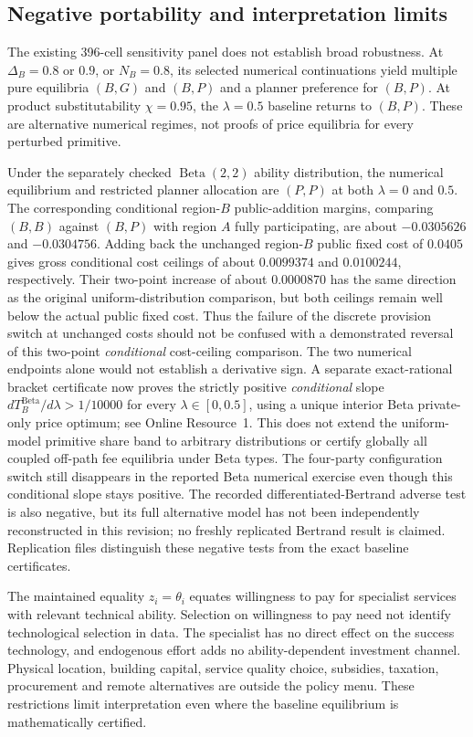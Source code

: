 \subsection{Negative portability and interpretation limits}\label{sec:robustness}
The existing 396-cell sensitivity panel does not establish broad robustness.
At $\Delta_B=0.8$ or $0.9$, or $N_B=0.8$, its selected numerical continuations yield multiple pure equilibria $(B,G)$ and $(B,P)$ and a planner preference for $(B,P)$.
At product substitutability $\chi=0.95$, the $\lambda=0.5$ baseline returns to $(B,P)$.
These are alternative numerical regimes, not proofs of price equilibria for every perturbed primitive.

Under the separately checked $\operatorname{Beta}(2,2)$ ability distribution, the numerical equilibrium and restricted planner allocation are $(P,P)$ at both $\lambda=0$ and $0.5$.
The corresponding conditional region-$B$ public-addition margins, comparing $(B,B)$ against $(B,P)$ with region $A$ fully participating, are about $-0.0305626$ and $-0.0304756$.
Adding back the unchanged region-$B$ public fixed cost of $0.0405$ gives gross conditional cost ceilings of about $0.0099374$ and $0.0100244$, respectively. Their two-point increase of about $0.0000870$ has the same direction as the original uniform-distribution comparison, but both ceilings remain well below the actual public fixed cost. Thus the failure of the discrete provision switch at unchanged costs should not be confused with a demonstrated reversal of this two-point \emph{conditional} cost-ceiling comparison.
The two numerical endpoints alone would not establish a derivative sign. A separate exact-rational bracket certificate now proves the strictly positive \emph{conditional} slope $dT_B^{\mathrm{Beta}}/d\lambda>1/10000$ for every $\lambda\in[0,0.5]$, using a unique interior Beta private-only price optimum; see Online Resource~1. This does not extend the uniform-model primitive share band to arbitrary distributions or certify globally all coupled off-path fee equilibria under Beta types. The four-party configuration switch still disappears in the reported Beta numerical exercise even though this conditional slope stays positive.
The recorded differentiated-Bertrand adverse test is also negative, but its full alternative model has not been independently reconstructed in this revision; no freshly replicated Bertrand result is claimed.
Replication files distinguish these negative tests from the exact baseline certificates.

The maintained equality $z_i=\theta_i$ equates willingness to pay for specialist services with relevant technical ability.
Selection on willingness to pay need not identify technological selection in data.
The specialist has no direct effect on the success technology, and endogenous effort adds no ability-dependent investment channel.
Physical location, building capital, service quality choice, subsidies, taxation, procurement and remote alternatives are outside the policy menu.
These restrictions limit interpretation even where the baseline equilibrium is mathematically certified.
